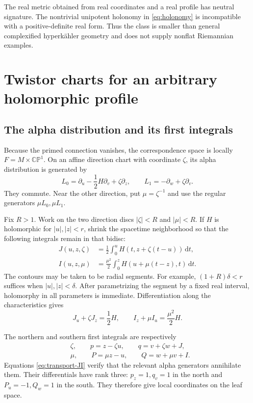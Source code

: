 \documentclass[11pt]{article}
\numberwithin{equation}{section}
\theoremstyle{definition}
\theoremstyle{remark}
\newcommand{\CP}{\mathbb{CP}}
\newcommand{\dd}{\mathrm d}
\begin{document}
The real metric obtained from real coordinates and a real profile has neutral signature. The nontrivial unipotent holonomy in \eqref{eq:holonomy} is incompatible with a positive-definite real form. Thus the class is smaller than general complexified hyperkähler geometry and does not supply nonflat Riemannian examples.

\section{Twistor charts for an arbitrary holomorphic profile}

\subsection{The alpha distribution and its first integrals}

Because the primed connection vanishes, the correspondence space is locally $F=M\times\CP^1$. On an affine direction chart with coordinate $\zeta$, its alpha distribution is generated by
\begin{equation}\label{eq:L}
L_0=\partial_u-\frac12H\partial_v+\zeta\partial_z,
\qquad L_1=-\partial_w+\zeta\partial_v.
\end{equation}
They commute. Near the other direction, put $\mu=\zeta^{-1}$ and use the regular generators $\mu L_0,\mu L_1$.

Fix $R>1$. Work on the two direction discs $|\zeta|<R$ and $|\mu|<R$. If $H$ is holomorphic for $|u|,|z|<r$, shrink the spacetime neighborhood so that the following integrals remain in that bidisc:
\begin{align}
J(u,z,\zeta)&=\frac12\int_0^u H(t,z+\zeta(t-u))\,\dd t,
\label{eq:J}\\
I(u,z,\mu)&=\frac{\mu^2}{2}\int_0^z H(u+\mu(t-z),t)\,\dd t.
\label{eq:I}
\end{align}
The contours may be taken to be radial segments. For example, $(1+R)\delta<r$ suffices when $|u|,|z|<\delta$. After parametrizing the segment by a fixed real interval, holomorphy in all parameters is immediate. Differentiation along the characteristics gives
\begin{equation}\label{eq:transport-JI}
J_u+\zeta J_z=\frac12H,
\qquad I_z+\mu I_u=\frac{\mu^2}{2}H.
\end{equation}

The northern and southern first integrals are respectively
\begin{align}
&\zeta,\qquad p=z-\zeta u,\qquad q=v+\zeta w+J,
\label{eq:north}\\
&\mu,\qquad P=\mu z-u,\qquad Q=w+\mu v+I.
\label{eq:south}
\end{align}
Equations \eqref{eq:transport-JI} verify that the relevant alpha generators annihilate them. Their differentials have rank three: $p_z=1,q_v=1$ in the north and $P_u=-1,Q_w=1$ in the south. They therefore give local coordinates on the leaf space.
\end{document}
